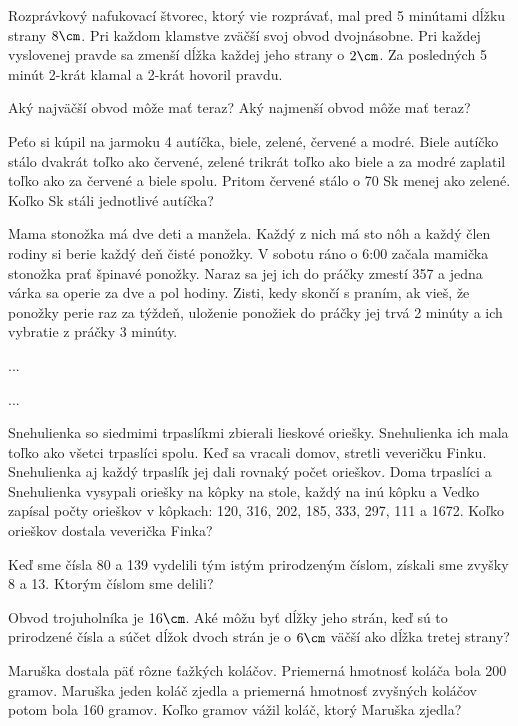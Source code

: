 {%
Rozprávkový nafukovací štvorec, ktorý vie rozprávať, mal pred 5 minútami dĺžku strany $8\cm$.
Pri každom klamstve zväčší svoj obvod dvojnásobne. Pri každej vyslovenej pravde sa zmenší
dĺžka každej jeho strany o $2\cm$. Za posledných 5 minút 2-krát klamal a 2-krát hovoril pravdu.
\begin{itemize}
 Aký najväčší obvod môže mať teraz?
 Aký najmenší obvod môže mať teraz?
\end{itemize}
}

{%
Peťo si kúpil na jarmoku 4 autíčka, biele, zelené, červené a modré. Biele autíčko stálo dvakrát
toľko ako červené, zelené trikrát toľko ako biele a za modré zaplatil toľko ako za červené a
biele spolu. Pritom červené stálo o 70 Sk menej ako zelené. Koľko Sk stáli jednotlivé autíčka?}

{%
Mama stonožka má dve deti a manžela. Každý z nich má sto nôh a každý člen rodiny si berie
každý deň čisté ponožky. V sobotu ráno o 6:00 začala mamička stonožka prať špinavé
ponožky. Naraz sa jej ich do práčky zmestí 357 a jedna várka sa operie za dve a pol hodiny.
Zisti, kedy skončí s praním, ak vieš, že ponožky perie raz za týždeň, uloženie ponožiek do
práčky jej trvá 2 minúty a ich vybratie z práčky 3 minúty.}

{%
...}

{%
...}

{%
Snehulienka so siedmimi trpaslíkmi zbierali lieskové oriešky. Snehulienka ich mala toľko ako všetci trpaslíci spolu. Keď sa vracali domov, stretli veveričku Finku. Snehulienka aj každý trpaslík jej dali rovnaký počet orieškov. Doma trpaslíci a Snehulienka vysypali oriešky na kôpky na stole, každý na inú kôpku a Vedko zapísal počty orieškov v kôpkach: 120, 316, 202, 185, 333, 297, 111 a 1672. Koľko orieškov dostala veverička Finka?}

{%
Keď sme čísla 80 a 139 vydelili tým istým prirodzeným číslom, získali sme zvyšky 8 a 13. Ktorým číslom sme delili?}

{%
Obvod trojuholníka je $16\cm$. Aké môžu byť dĺžky jeho strán, keď sú to prirodzené čísla a súčet dĺžok dvoch strán je o $6\cm$ väčší ako dĺžka tretej strany?}

{%
Maruška dostala päť rôzne ťažkých koláčov. Priemerná hmotnosť koláča bola 200 gramov. Maruška jeden koláč zjedla a priemerná hmotnosť zvyšných koláčov potom bola 160 gramov. Koľko gramov vážil koláč, ktorý Maruška zjedla?}

